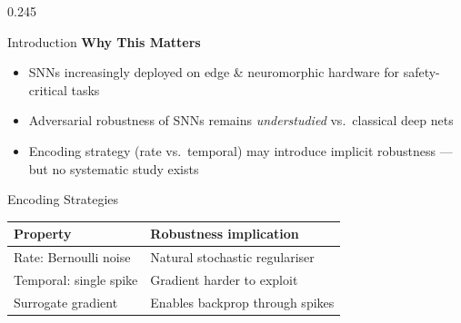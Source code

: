 \documentclass[final]{beamer}
\begin{document}
\begin{frame}[t]
\begin{columns}[t,totalwidth=\paperwidth]
\begin{column}{0.245\paperwidth}
\begin{block}{Introduction}
  \vspace{0.4em}
  \textbf{\color{accentblue}Why This Matters}
  \begin{itemize}
    \item SNNs increasingly deployed on edge \& neuromorphic hardware for safety-critical tasks
    \item Adversarial robustness of SNNs remains \emph{understudied} vs.\ classical deep nets
    \item Encoding strategy (rate vs.\ temporal) may introduce implicit robustness --- but no systematic study exists
  \end{itemize}
\end{block}

\begin{block}{Encoding Strategies}

  \vspace{0.4em}
  {\footnotesize\begin{tabular}{@{}ll@{}}
    \toprule
    \textbf{Property}        & \textbf{Robustness implication} \\
    \midrule
    Rate: Bernoulli noise    & Natural stochastic regulariser \\
    Temporal: single spike   & Gradient harder to exploit \\
    Surrogate gradient       & Enables backprop through spikes \\
    \bottomrule
  \end{tabular}}
\end{block}


\end{column}
\end{columns}
\end{frame}
\end{document}
